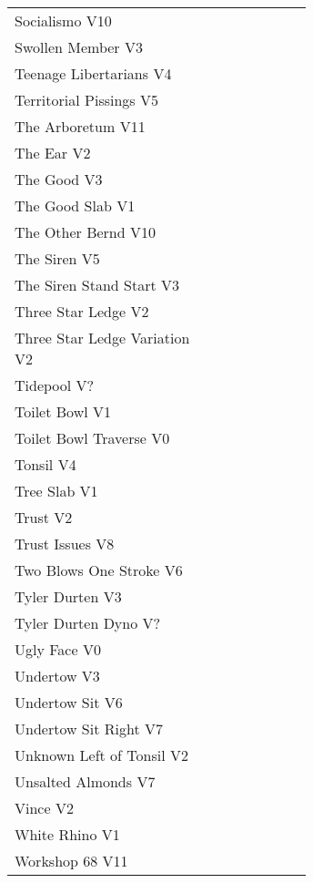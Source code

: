 \begin{center}
\begin{supertabular}{p{0.65\linewidth}r}
Socialismo V10 & \pageref{rt:Socialismo} \\
Swollen Member V3 & \pageref{rt:Swollen Member} \\
Teenage Libertarians V4 & \pageref{rt:Teenage Libertarians} \\
Territorial Pissings V5 & \pageref{rt:Territorial Pissings} \\
The Arboretum V11 & \pageref{rt:The Arboretum} \\
The Ear V2 & \pageref{rt:The Ear} \\
The Good V3 & \pageref{rt:The Good} \\
The Good Slab V1 & \pageref{rt:The Good Slab} \\
The Other Bernd V10 & \pageref{rt:The Other Bernd} \\
The Siren V5 & \pageref{rt:The Siren} \\
The Siren Stand Start V3 & \pageref{vr:The Siren Stand Start} \\
Three Star Ledge V2 & \pageref{rt:Three Star Ledge} \\
Three Star Ledge Variation V2 & \pageref{vr:Three Star Ledge Variation} \\
Tidepool V? & \pageref{rt:Tidepool} \\
Toilet Bowl V1 & \pageref{rt:Toilet Bowl} \\
Toilet Bowl Traverse V0 & \pageref{rt:Toilet Bowl Traverse} \\
Tonsil V4 & \pageref{rt:Tonsil} \\
Tree Slab V1 & \pageref{rt:Tree Slab} \\
Trust V2 & \pageref{rt:Trust} \\
Trust Issues V8 & \pageref{rt:Trust Issues} \\
Two Blows One Stroke V6 & \pageref{rt:Two Blows One Stroke} \\
Tyler Durten V3 & \pageref{rt:Tyler Durten} \\
Tyler Durten Dyno V? & \pageref{vr:Tyler Durten Dyno} \\
Ugly Face V0 & \pageref{rt:Ugly Face} \\
Undertow V3 & \pageref{rt:Undertow} \\
Undertow Sit V6 & \pageref{vr:Undertow Sit} \\
Undertow Sit Right V7 & \pageref{vr:Undertow Sit Right} \\
Unknown Left of Tonsil V2 & \pageref{rt:Unknown Left of Tonsil} \\
Unsalted Almonds V7 & \pageref{rt:Unsalted Almonds} \\
Vince V2 & \pageref{rt:Vince} \\
White Rhino V1 & \pageref{rt:White Rhino} \\
Workshop 68 V11 & \pageref{rt:Workshop 68} \\
\end{supertabular}
\end{center}
